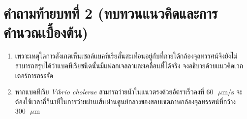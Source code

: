 \section*{คำถามท้ายบทที่ 2 (ทบทวนแนวคิดและการคำนวณเบื้องต้น)}
\begin{enumerate}
    \item เพราะเหตุใดการสังเกตเห็นเซลล์แบคทีเรียสั่นสะเทือนอยู่กับที่ภายใต้กล้องจุลทรรศน์จึงยังไม่สามารถสรุปได้ว่าแบคทีเรียชนิดนั้นมีแฟลกเจลลาและเคลื่อนที่ได้จริง จงอธิบายด้วยแนวคิดเวกเตอร์การกระจัด
    \item หากแบคทีเรีย \textit{Vibrio cholerae} สามารถว่ายน้ำในแนวตรงด้วยอัตราเร็วคงที่ $60\text{ }\mu\text{m/s}$ จะต้องใช้เวลากี่วินาทีในการว่ายผ่านเส้นผ่านศูนย์กลางของขอบเขตภาพกล้องจุลทรรศน์ที่กว้าง $300\text{ }\mu\text{m}$
\end{enumerate}
